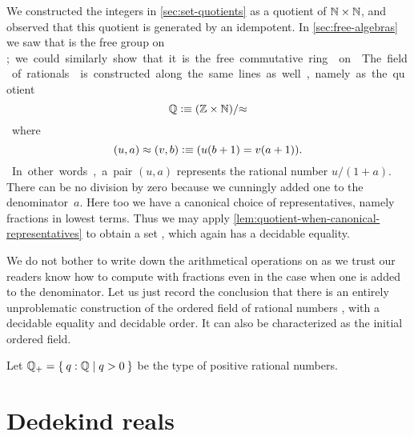 We constructed the integers \Z in \autoref{sec:set-quotients} as a quotient of $\mathbb{N}\times
\mathbb{N}$, and observed that this quotient is generated by an idempotent. In
\autoref{sec:free-algebras} we saw that \Z is the free group on \unit; we could similarly
show that it is the free commutative ring on \emptyt. The field of rationals \Q is
constructed along the same lines as well, namely as the quotient
%
\[ \mathbb{Q} \vcentcolon\equiv (\mathbb{Z} \times \mathbb{N})/{\approx} \]
%
where
\[ (u,a) \approx (v,b) \vcentcolon\equiv (u (b + 1) = v (a + 1)). \]
%
In other words, a pair $(u, a)$ represents the rational number $u / (1 + a)$. There can be
no division by zero because we cunningly added one to the denominator~$a$. Here too we
have a canonical choice of representatives, namely fractions in lowest terms. Thus we may
apply \autoref{lem:quotient-when-canonical-representatives} to obtain a set \Q, which
again has a decidable equality.

We do not bother to write down the arithmetical operations on \Q as we trust our readers
know how to compute with fractions even in the case when one is added to the denominator.
Let us just record the conclusion that there is an entirely unproblematic construction of
the ordered field of rational numbers \Q, with a decidable equality and decidable order.
It can also be characterized as the initial ordered field.

Let $\Qp = \setof{ q : \Q | q > 0 }$ be the type of positive rational numbers.

\section{Dedekind reals}
\label{sec:dedekind-reals}

